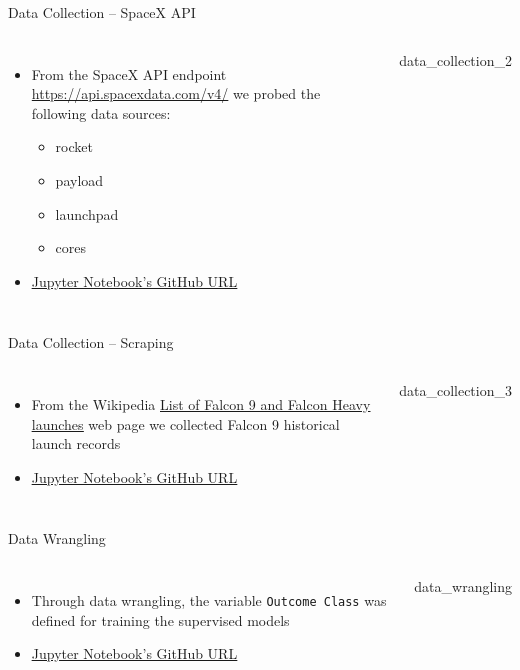 {\nologo
\begin{frame}{Data Collection -- SpaceX API}
    \begin{columns}
            \begin{itemize}
                \item From the SpaceX API endpoint \url{https://api.spacexdata.com/v4/} we probed the following data sources:
                \begin{itemize}
                    \item rocket
                    \item payload
                    \item launchpad
                    \item cores
                \end{itemize}
                \item \href{https://github.com/eyamrog/ibm_data_science/blob/main/10_Data_Science_Capstone_Lab1_Collecting_the_Data.ipynb}{\uline{Jupyter Notebook's GitHub URL}}
            \end{itemize}
            {data_collection_2}
    \end{columns}
\end{frame}
}

{\nologo
\begin{frame}{Data Collection -- Scraping}
    \begin{columns}
            \begin{itemize}
                \item From the Wikipedia \href{https://en.wikipedia.org/wiki/List_of_Falcon_9_and_Falcon_Heavy_launches}{\uline{List of Falcon 9 and Falcon Heavy launches}} web page we collected Falcon 9 historical launch records
                \item \href{https://github.com/eyamrog/ibm_data_science/blob/main/10_Data_Science_Capstone_Web_Scraping.ipynb}{\uline{Jupyter Notebook's GitHub URL}}
            \end{itemize}
            {data_collection_3}
    \end{columns}
\end{frame}
}

{\nologo
\begin{frame}{Data Wrangling}
    \begin{columns}
            \begin{itemize}
                \item Through data wrangling, the variable \texttt{Outcome Class} was defined for training the supervised models
                \item \href{https://github.com/eyamrog/ibm_data_science/blob/main/10_Data_Science_Capstone_Lab2_Data_Wrangling.ipynb}{\uline{Jupyter Notebook's GitHub URL}}
            \end{itemize}
            {data_wrangling}
    \end{columns}
\end{frame}
}

